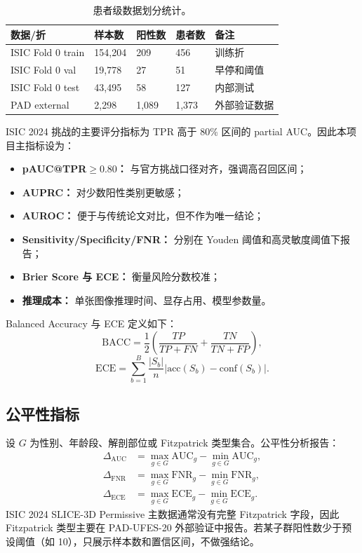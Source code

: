 \documentclass[UTF8,a4paper,10pt,twocolumn,fontset=fandol]{ctexart}
\newcommand{\isic}{ISIC 2024 SLICE-3D Permissive}
\newcommand{\pad}{PAD-UFES-20}
\begin{document}
\begin{table}[H]
\centering
\small
\caption{患者级数据划分统计。}
\label{tab:split}
\begin{tabularx}{\columnwidth}{L{1.4cm}C{1.5cm}C{1.5cm}C{1.5cm}Y}
\toprule
数据/折 & 样本数 & 阳性数 & 患者数 & 备注 \\
\midrule
ISIC Fold 0 train & 154,204 & 209 & 456 & 训练折 \\
ISIC Fold 0 val & 19,778 & 27 & 51 & 早停和阈值 \\
ISIC Fold 0 test & 43,495 & 58 & 127 & 内部测试 \\
PAD external & 2,298 & 1,089 & 1,373 & 外部验证数据\\
\bottomrule
\end{tabularx}
\end{table}

ISIC 2024 挑战的主要评分指标为 TPR 高于 80\% 区间的 partial AUC\cite{kaggleisic2024}。因此本项目主指标设为：
\begin{itemize}
    \item \textbf{pAUC@TPR$\geq0.80$：} 与官方挑战口径对齐，强调高召回区间；
    \item \textbf{AUPRC：} 对少数阳性类别更敏感；
    \item \textbf{AUROC：} 便于与传统论文对比，但不作为唯一结论；
    \item \textbf{Sensitivity/Specificity/FNR：} 分别在 Youden 阈值和高灵敏度阈值下报告；
    \item \textbf{Brier Score 与 ECE：} 衡量风险分数校准；
    \item \textbf{推理成本：} 单张图像推理时间、显存占用、模型参数量。
\end{itemize}
Balanced Accuracy 与 ECE 定义如下：
\begin{equation}
    \mathrm{BACC}=\frac{1}{2}\left(\frac{TP}{TP+FN}+\frac{TN}{TN+FP}\right),
\end{equation}
\begin{equation}
    \mathrm{ECE}=\sum_{b=1}^{B}\frac{|S_b|}{n}\left|\mathrm{acc}(S_b)-\mathrm{conf}(S_b)\right|.
\end{equation}

\subsection{公平性指标}
设 $G$ 为性别、年龄段、解剖部位或 Fitzpatrick 类型集合。公平性分析报告：
\begin{align}
    \Delta_{\mathrm{AUC}} &= \max_{g\in G}\mathrm{AUC}_g - \min_{g\in G}\mathrm{AUC}_g,\\
    \Delta_{\mathrm{FNR}} &= \max_{g\in G}\mathrm{FNR}_g - \min_{g\in G}\mathrm{FNR}_g,\\
    \Delta_{\mathrm{ECE}} &= \max_{g\in G}\mathrm{ECE}_g - \min_{g\in G}\mathrm{ECE}_g.
\end{align}
\isic{} 主数据通常没有完整 Fitzpatrick 字段，因此 Fitzpatrick 类型主要在 \pad{} 外部验证中报告。若某子群阳性数少于预设阈值（如 10），只展示样本数和置信区间，不做强结论。
\end{document}
